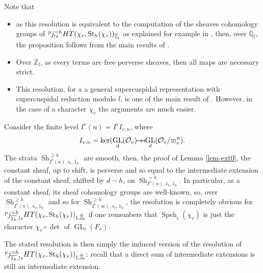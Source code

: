 \documentclass[JEP,XML,SOM,Unicode,published]{cedram}
\newcommand{\onto}{\mathchoice{\to\hspace*{-5mm}\to}{\to\hspace*{-2.85mm}\to}{\to\hspace*{-3mm}\to}{\to\hspace*{-3mm}\to}}
\DeclareMathOperator{\GL}{GL}
\theoremstyle{plain}
\theoremstyle{definition}
\numberwithin{equation}{subsection}
\newcommand\Qm{{\mathbb Q}}
\newcommand\Zm{{\mathbb Z}}
\newcommand\OC{{\mathcal O}}
\newcommand{\lexp}[2]{\kern \scriptspace \vphantom{#2}^{#1}\kern-\scriptspace#2}
\DeclareMathOperator{\sh}{Sh}
\DeclareMathOperator{\speh}{Speh}
\DeclareMathOperator{\st}{St}
\let \oo=\infty
\begin{document}
Note that
\begin{itemize}
\item as this resolution is equivalent to the computation of the sheaves
cohomology groups
of $\lexp p j_{!*}^{=h} HT(\chi_v,\st_h(\chi_v))_{\overline \Zm_l} $
as explained for example in
\cite[Prop.\,B.1.5]{boyer-duke}, then,
over $\overline \Qm_l$, the proposition follows from the main results of \cite{boyer-invent2}.

\item Over $\overline \Zm_l$, as every terms are free perverse sheaves, then
all maps are necessary strict.

\item This resolution, for a a general supercuspidal representation
with supercuspidal reduction modulo $l$, is one of the main result
of \cite[\S2.3]{boyer-duke}. However, in the case of a character $\chi_v$ the arguments are much easier.
\end{itemize}

Consider the finite level $I^v(n)=I^v I_{v,n}$, where
\[
I_{v,n}=\ker (\GL_d(\OC_v) \onto
\GL_d(\OC_v/\varpi_v^n).
\]
The strata
$\sh^{\geq h}_{I^v(n),\bar s_v,\overline{1_h}}$ are smooth, then, \cf the proof of Lemma
\ref{lem-ext0}, the constant sheaf, up to shift, is perverse and
so equal to the intermediate extension of the constant sheaf, shifted by $d-h$,
on $\sh^{=h}_{I^v(n),\bar s_v,\overline{1_h}}$. In particular, as a constant sheaf,
its sheaf cohomology groups are well-known,
so, over $\sh^{\geq h}_{I^v(n),\bar s_v,\overline{1_h}}$ and so
for $\sh^{\geq h}_{I^v(\oo),\bar s_v,\overline{1_h}}$, the resolution is completely obvious for
$\lexp p j_{\overline{1_h},!*}^{=h} HT(\chi_v,\st_h(\chi_v))_{1,\overline \Zm_l}$
if one remembers that $\speh_i(\chi_v)$ is just the character $\chi_v \circ \det$
of $\GL_i(F_v)$.

The stated resolution is then simply the induced version of the resolution
of $\lexp p j^{=h}_{\overline{1_h},!*} HT(\chi_v,\st_h(\chi_v))_{1,\overline \Zm_l}$:
recall that a direct sum of intermediate extensions is still an intermediate
extension.
\end{document}
